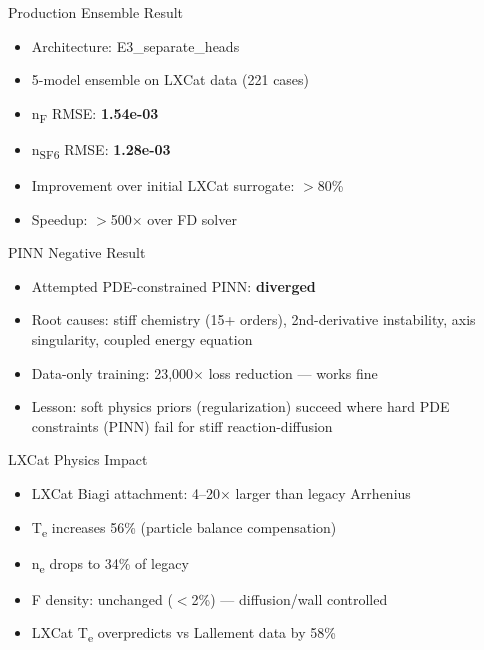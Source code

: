 \documentclass[aspectratio=169]{beamer}
\begin{document}
\begin{frame}{Production Ensemble Result}
\begin{itemize}
  \item Architecture: E3\_separate\_heads
  \item 5-model ensemble on LXCat data (221 cases)
  \item n\textsubscript{F} RMSE: \textbf{1.54e-03}
  \item n\textsubscript{SF6} RMSE: \textbf{1.28e-03}
  \item Improvement over initial LXCat surrogate: $>$80\%
  \item Speedup: $>$500$\times$ over FD solver
\end{itemize}
\end{frame}

\begin{frame}{PINN Negative Result}
\begin{itemize}
  \item Attempted PDE-constrained PINN: \textbf{diverged}
  \item Root causes: stiff chemistry (15+ orders), 2nd-derivative instability,
    axis singularity, coupled energy equation
  \item Data-only training: 23{,}000$\times$ loss reduction --- works fine
  \item Lesson: soft physics priors (regularization) succeed where hard
    PDE constraints (PINN) fail for stiff reaction-diffusion
\end{itemize}
\end{frame}

\begin{frame}{LXCat Physics Impact}
\begin{itemize}
  \item LXCat Biagi attachment: 4--20$\times$ larger than legacy Arrhenius
  \item T\textsubscript{e} increases 56\% (particle balance compensation)
  \item n\textsubscript{e} drops to 34\% of legacy
  \item F density: unchanged ($<$2\%) --- diffusion/wall controlled
  \item LXCat T\textsubscript{e} overpredicts vs Lallement data by 58\%
\end{itemize}
\end{frame}
\end{document}
